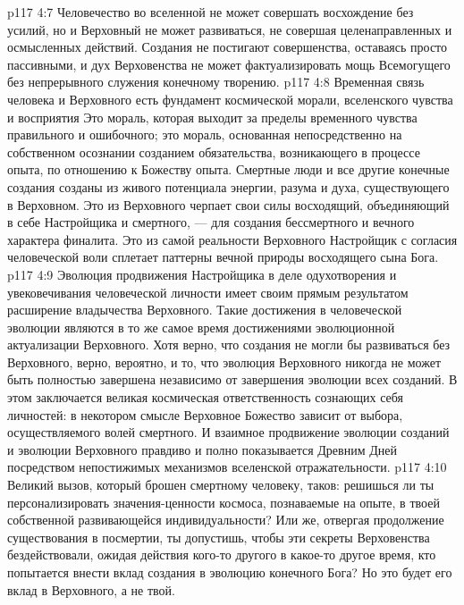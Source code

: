 \vs p117 4:7 \pc Человечество во вселенной не может совершать восхождение без усилий, но и Верховный не может развиваться, не совершая целенаправленных и осмысленных действий. Создания не постигают совершенства, оставаясь просто пассивными, и дух Верховенства не может фактуализировать мощь Всемогущего без непрерывного служения конечному творению.
\vs p117 4:8 Временная связь человека и Верховного есть фундамент космической морали, вселенского чувства и восприятия  Это мораль, которая выходит за пределы временного чувства правильного и ошибочного; это мораль, основанная непосредственно на собственном осознании созданием обязательства, возникающего в процессе опыта, по отношению к Божеству опыта. Смертные люди и все другие конечные создания созданы из живого потенциала энергии, разума и духа, существующего в Верховном. Это из Верховного черпает свои силы восходящий, объединяющий в себе Настройщика и смертного, --- для создания бессмертного и вечного характера финалита. Это из самой реальности Верховного Настройщик с согласия человеческой воли сплетает паттерны вечной природы восходящего сына Бога.
\vs p117 4:9 Эволюция продвижения Настройщика в деле одухотворения и увековечивания человеческой личности имеет своим прямым результатом расширение владычества Верховного. Такие достижения в человеческой эволюции являются в то же самое время достижениями эволюционной актуализации Верховного. Хотя верно, что создания не могли бы развиваться без Верховного, верно, вероятно, и то, что эволюция Верховного никогда не может быть полностью завершена независимо от завершения эволюции всех созданий. В этом заключается великая космическая ответственность сознающих себя личностей: в некотором смысле Верховное Божество зависит от выбора, осуществляемого волей смертного. И взаимное продвижение эволюции созданий и эволюции Верховного правдиво и полно показывается Древним Дней посредством непостижимых механизмов вселенской отражательности.
\vs p117 4:10 Великий вызов, который брошен смертному человеку, таков: решишься ли ты персонализировать значения\hyp{}ценности космоса, познаваемые на опыте, в твоей собственной развивающейся индивидуальности? Или же, отвергая продолжение существования в посмертии, ты допустишь, чтобы эти секреты Верховенства бездействовали, ожидая действия кого\hyp{}то другого в какое\hyp{}то другое время, кто попытается  внести вклад создания в эволюцию конечного Бога? Но это будет его вклад в Верховного, а не твой.
